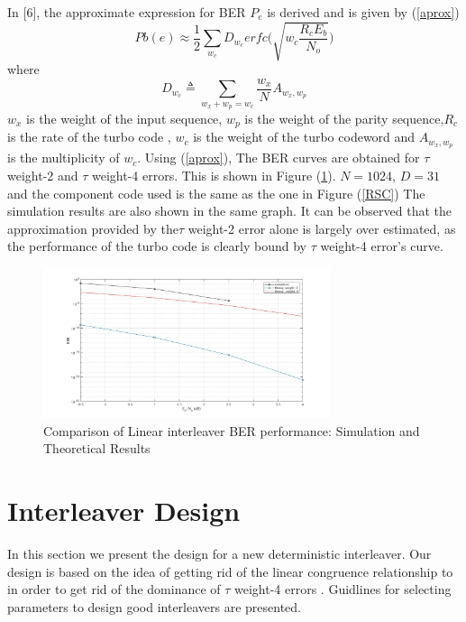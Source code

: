 \documentclass[20 pts]{article}
\begin{document}
In [6], the approximate expression for BER $P_e$ is derived and is given by
(\ref{aprox})
\begin{equation} 
 Pb(e) \approx \frac{1}{2}\sum_{w_c}D_{w_c} 
  erfc \Bigg(\sqrt{w_c\frac{R_cE_b}{N_o}} \Bigg)
  \label{aprox}
  \end{equation}
 where 
  $$ D_{w_c}\triangleq \sum_{w_x+w_p=w_c} \frac{w_x}{N}A_{w_x,w_p}$$
  $w_x$ is the weight of the input sequence, $w_p$ is the weight of the parity 
  sequence,$R_c$ is the rate of the turbo code , $w_c$ is the weight of the turbo 
  codeword and $A_{w_x,w_p}$ is the multiplicity of $w_c$. Using (\ref{aprox}),
  The BER curves are obtained for $\tau$ weight-2 and $\tau$ weight-4 errors. 
  This is shown in Figure (\ref{comp}). $N=1024$, $D=31$ and the component code used is the
  same as the one in Figure (\ref{RSC})
  The simulation results are also shown in the same graph. It can be observed that
  the approximation provided by the$\tau$ weight-2 error alone is largely over estimated,
  as the performance of the turbo code is clearly bound by  $\tau$ weight-4 error's
  curve. 
\begin{figure}[h!]
\centering
		\includegraphics[width=0.75\textwidth]{D_31_N_1024_sim_VS_theory.png}
		\caption{Comparison of Linear interleaver BER performance: Simulation and Theoretical Results}
		\label{comp}
		\end{figure}





\section{Interleaver Design}
\label{sec}
In this section we present the design for a new deterministic interleaver. 
Our design is based on the idea of getting rid of the linear congruence
relationship to in order to get rid of the dominance of $\tau$ weight-4 errors
 . Guidlines for selecting
parameters to design good interleavers are presented.  
\end{document}
